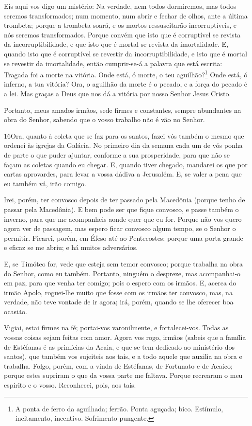Eis aqui vos digo um mistério: Na verdade, nem todos dormiremos,
mas todos seremos transformados; num momento, num abrir e
fechar de olhos, ante a última trombeta; porque a trombeta soará, e
os mortos ressuscitarão incorruptíveis, e nós seremos transformados.
Porque convém que isto que é corruptível se revista da
incorruptibilidade, e que isto que é mortal se revista da
imortalidade. E, quando isto que é corruptível se revestir da
incorruptibilidade, e isto que é mortal se revestir da imortalidade,
então cumprir-se-á a palavra que está escrita: Tragada foi a morte
na vitória. Onde está, ó morte, o teu aguilhão?\footnote{A
ponta de ferro da aguilhada; ferrão. Ponta aguçada; bico. Estímulo,
incitamento, incentivo. Sofrimento pungente.} Onde está, ó inferno,
a tua vitória? Ora, o aguilhão da morte é o pecado, e a força
do pecado é a lei. Mas graças a Deus que nos dá a vitória por
nosso Senhor Jesus Cristo.

Portanto, meus amados irmãos, sede firmes e constantes, sempre
abundantes na obra do Senhor, sabendo que o vosso trabalho não é vão
no Senhor.

\medskip

\lettrine{16} Ora, quanto à coleta que se faz para os santos,
fazei vós também o mesmo que ordenei às igrejas da Galácia. No
primeiro dia da semana cada um de vós ponha de parte o que puder
ajuntar, conforme a sua prosperidade, para que não se façam as
coletas quando eu chegar. E, quando tiver chegado, mandarei os
que por cartas aprovardes, para levar a vossa dádiva a Jerusalém.
E, se valer a pena que eu também vá, irão comigo.

Irei, porém, ter convosco depois de ter passado pela Macedônia
(porque tenho de passar pela Macedônia). E bem pode ser que
fique convosco, e passe também o inverno, para que me acompanheis
aonde quer que eu for. Porque não vos quero agora ver de
passagem, mas espero ficar convosco algum tempo, se o Senhor o
permitir. Ficarei, porém, em Éfeso até ao Pentecostes;
porque uma porta grande e eficaz se me abriu; e há muitos
adversários.

E, se Timóteo for, vede que esteja sem temor convosco; porque
trabalha na obra do Senhor, como eu também. Portanto, ninguém
o despreze, mas acompanhai-o em paz, para que venha ter comigo; pois
o espero com os irmãos. E, acerca do irmão Apolo, roguei-lhe
muito que fosse com os irmãos ter convosco, mas, na verdade, não
teve vontade de ir agora; irá, porém, quando se lhe oferecer boa
ocasião.

Vigiai, estai firmes na fé; portai-vos varonilmente, e
fortalecei-vos. Todas as vossas coisas sejam feitas com amor.
Agora vos rogo, irmãos (sabeis que a família de Estéfanas é
as primícias da Acaia, e que se tem dedicado ao ministério dos
santos), que também vos sujeiteis aos tais, e a todo aquele
que auxilia na obra e trabalha. Folgo, porém, com a vinda de
Estéfanas, de Fortunato e de Acaico; porque estes supriram o que da
vossa parte me faltava. Porque recrearam o meu espírito e o
vosso. Reconhecei, pois, aos tais.

